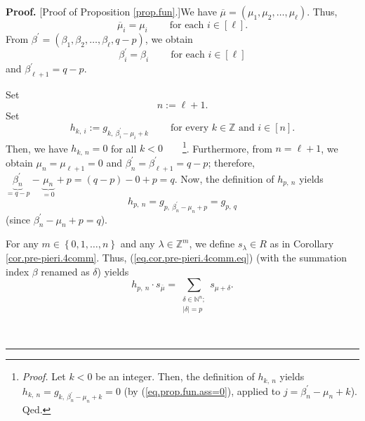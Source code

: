 \documentclass
[numbers=enddot,12pt,final,onecolumn,notitlepage,english]{scrartcl}%
\theoremstyle{definition}
\newenvironment{proof}[1][Proof]{\noindent\textbf{#1.} }{\ \rule{0.5em}{0.5em}}
\let\sumnonlimits\sum
\renewcommand{\sum}{\sumnonlimits\limits}
\newenvironment{verlong}{}{}
\begin{document}
\begin{verlong}
\begin{proof}
[Proof of Proposition \ref{prop.fun}.]We have $\overline{\mu}=\left(  \mu
_{1},\mu_{2},\ldots,\mu_{\ell}\right)  $. Thus,%
\begin{equation}
\overline{\mu}_{i}=\mu_{i}\ \ \ \ \ \ \ \ \ \ \text{for each }i\in\left[
\ell\right]  . \label{pf.prop.fun.mubari}%
\end{equation}
From $\beta^{\prime}=\left(  \beta_{1},\beta_{2},\ldots,\beta_{\ell
},q-p\right)  $, we obtain%
\begin{equation}
\beta_{i}^{\prime}=\beta_{i}\ \ \ \ \ \ \ \ \ \ \text{for each }i\in\left[
\ell\right]  \label{pf.prop.fun.bprimei}%
\end{equation}
and $\beta_{\ell+1}^{\prime}=q-p$.

Set
\begin{equation}
n:=\ell+1. \label{pf.prop.fun.0}%
\end{equation}
Set%
\[
h_{k,\ i}:=g_{k,\ \beta_{i}^{\prime}-\mu_{i}+k}\ \ \ \ \ \ \ \ \ \ \text{for
every }k\in\mathbb{Z}\text{ and }i\in\left[  n\right]  .
\]
Then, we have $h_{k,\ n}=0$ for all $k<0$\ \ \ \ \footnote{\textit{Proof.} Let
$k<0$ be an integer. Then, the definition of $h_{k,\ n}$ yields $h_{k,\ n}%
=g_{k,\ \beta_{n}^{\prime}-\mu_{n}+k}=0$ (by (\ref{eq.prop.fun.ass=0}),
applied to $j=\beta_{n}^{\prime}-\mu_{n}+k$). Qed.}. Furthermore, from
$n=\ell+1$, we obtain $\mu_{n}=\mu_{\ell+1}=0$ and $\beta_{n}^{\prime}%
=\beta_{\ell+1}^{\prime}=q-p$; therefore, $\underbrace{\beta_{n}^{\prime}%
}_{=q-p}-\underbrace{\mu_{n}}_{=0}+p=\left(  q-p\right)  -0+p=q$. Now, the
definition of $h_{p,\ n}$ yields%
\begin{equation}
h_{p,\ n}=g_{p,\ \beta_{n}^{\prime}-\mu_{n}+p}=g_{p,\ q} \label{pf.prop.fun.1}%
\end{equation}
(since $\beta_{n}^{\prime}-\mu_{n}+p=q$).

For any $m\in\left\{  0,1,\ldots,n\right\}  $ and any $\lambda\in
\mathbb{Z}^{m}$, we define $s_{\lambda}\in R$ as in Corollary
\ref{cor.pre-pieri.4comm}. Thus, (\ref{eq.cor.pre-pieri.4comm.eq}) (with the
summation index $\beta$ renamed as $\delta$) yields%
\begin{equation}
h_{p,\ n}\cdot s_{\overline{\mu}}=\sum_{\substack{\delta\in\mathbb{N}%
^{n};\\\left\vert \delta\right\vert =p}}s_{\mu+\delta}.
\label{pf.prop.fun.cor}%
\end{equation}



\end{proof}
\end{verlong}
\end{document}

